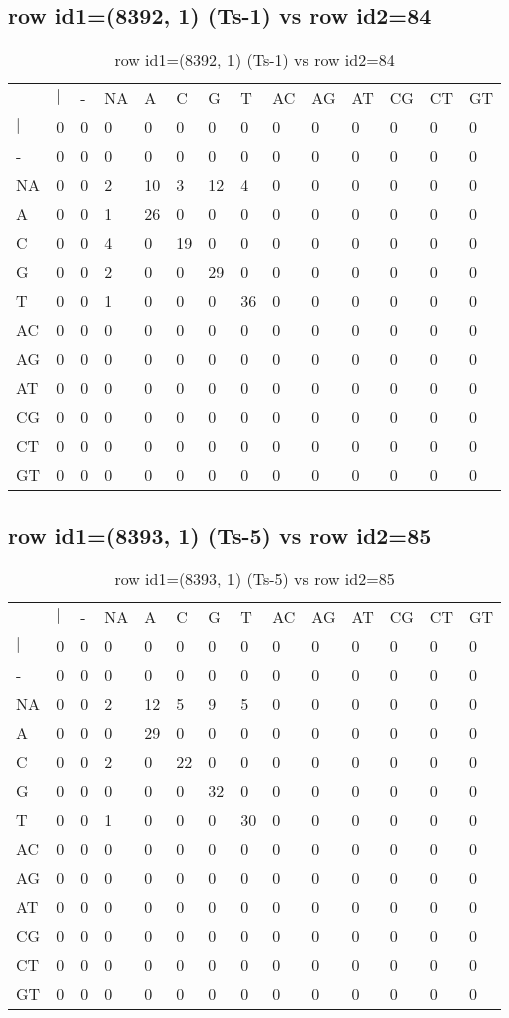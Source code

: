 \subsection{row id1=(8392, 1) (Ts-1) vs row id2=84}
\begin{center}
\begin{longtable}{|l|l|l|l|l|l|l|l|l|l|l|l|l|l|}
\caption{row id1=(8392, 1) (Ts-1) vs row id2=84} \label{table_dm646}\\
\hline
\\
\hline
&$|$&-&NA&A&C&G&T&AC&AG&AT&CG&CT&GT\\
$|$&0&0&0&0&0&0&0&0&0&0&0&0&0\\
-&0&0&0&0&0&0&0&0&0&0&0&0&0\\
NA&0&0&2&10&3&12&4&0&0&0&0&0&0\\
A&0&0&1&26&0&0&0&0&0&0&0&0&0\\
C&0&0&4&0&19&0&0&0&0&0&0&0&0\\
G&0&0&2&0&0&29&0&0&0&0&0&0&0\\
T&0&0&1&0&0&0&36&0&0&0&0&0&0\\
AC&0&0&0&0&0&0&0&0&0&0&0&0&0\\
AG&0&0&0&0&0&0&0&0&0&0&0&0&0\\
AT&0&0&0&0&0&0&0&0&0&0&0&0&0\\
CG&0&0&0&0&0&0&0&0&0&0&0&0&0\\
CT&0&0&0&0&0&0&0&0&0&0&0&0&0\\
GT&0&0&0&0&0&0&0&0&0&0&0&0&0\\
\hline
\end{longtable}
\end{center}

\subsection{row id1=(8393, 1) (Ts-5) vs row id2=85}
\begin{center}
\begin{longtable}{|l|l|l|l|l|l|l|l|l|l|l|l|l|l|}
\caption{row id1=(8393, 1) (Ts-5) vs row id2=85} \label{table_dm648}\\
\hline
\\
\hline
&$|$&-&NA&A&C&G&T&AC&AG&AT&CG&CT&GT\\
$|$&0&0&0&0&0&0&0&0&0&0&0&0&0\\
-&0&0&0&0&0&0&0&0&0&0&0&0&0\\
NA&0&0&2&12&5&9&5&0&0&0&0&0&0\\
A&0&0&0&29&0&0&0&0&0&0&0&0&0\\
C&0&0&2&0&22&0&0&0&0&0&0&0&0\\
G&0&0&0&0&0&32&0&0&0&0&0&0&0\\
T&0&0&1&0&0&0&30&0&0&0&0&0&0\\
AC&0&0&0&0&0&0&0&0&0&0&0&0&0\\
AG&0&0&0&0&0&0&0&0&0&0&0&0&0\\
AT&0&0&0&0&0&0&0&0&0&0&0&0&0\\
CG&0&0&0&0&0&0&0&0&0&0&0&0&0\\
CT&0&0&0&0&0&0&0&0&0&0&0&0&0\\
GT&0&0&0&0&0&0&0&0&0&0&0&0&0\\
\hline
\end{longtable}
\end{center}

